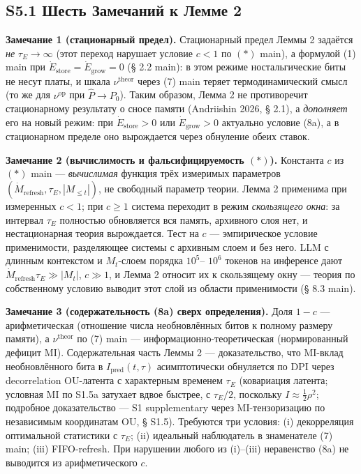 \documentclass[pdflatex,sn-mathphys-ay]{sn-jnl}
\begin{document}
\subsection*{S5.1 Шесть Замечаний к Лемме 2}\label{s5.1-ux448ux435ux441ux442ux44c-ux437ux430ux43cux435ux447ux430ux43dux438ux439-ux43a-ux43bux435ux43cux43cux435-2}



\textbf{Замечание 1 (стационарный предел).} Стационарный предел Леммы 2 задаётся \emph{не} \(\tau_E \to \infty\) (этот переход нарушает условие \(c < 1\) по \((*)\) main), а формулой (1) main при \(\dot{E}_{\text{store}} = \dot{E}_{\text{grow}} = 0\) (§ 2.2 main): в этом режиме ностальгические биты не несут платы, и шкала \(\nu^{\text{theor}}\) через (7) main теряет термодинамический смысл (то же для \(\nu^{\text{op}}\) при \(\hat P \to P_0\)). Таким образом, Лемма 2 не противоречит стационарному результату о сносе памяти (Andriishin 2026, § 2.1), а \emph{дополняет} его на новый режим: при \(\dot E_{\text{store}} > 0\) или \(\dot E_{\text{grow}} > 0\) актуально условие (8a), а в стационарном пределе оно вырождается через обнуление обеих ставок.



\textbf{Замечание 2 (вычислимость и фальсифицируемость \((*)\)).} Константа \(c\) из \((*)\) main --- \emph{вычислимая} функция трёх измеримых параметров \((\dot{M}_{\text{refresh}}, \tau_E, |M_{\le t}|)\), не свободный параметр теории. Лемма 2 применима при измеренных \(c < 1\); при \(c \ge 1\) система переходит в режим \emph{скользящего окна}: за интервал \(\tau_E\) полностью обновляется вся память, архивного слоя нет, и нестационарная теория вырождается. Тест на \(c\) --- эмпирическое условие применимости, разделяющее системы с архивным слоем и без него. LLM с длинным контекстом и \(M_t\)-слоем порядка \(10^5\)-- \(10^6\) токенов на инференсе дают \(\dot{M}_{\text{refresh}} \tau_E \gg |M_t|\), \(c \gg 1\), и Лемма 2 относит их к скользящему окну --- теория по собственному условию выводит этот слой из области применимости (§ 8.3 main).



\textbf{Замечание 3 (содержательность (8a) сверх определения).} Доля \(1-c\) --- арифметическая (отношение числа необновлённых битов к полному размеру памяти), а \(\nu^{\text{theor}}\) по (7) main --- информационно-теоретическая (нормированный дефицит MI). Содержательная часть Леммы 2 --- доказательство, что MI-вклад необновлённого бита в \(I_{\text{pred}}(t,\tau)\) асимптотически обнуляется по DPI через decorrelation OU-латента с характерным временем \(\tau_E\) (ковариация латента; условная MI по S1.5a затухает вдвое быстрее, с \(\tau_E/2\), поскольку \(I \approx \tfrac{1}{2}\rho^2\); подробное доказательство --- S1 supplementary через MI-тензоризацию по независимым координатам OU, § S1.5). Требуются три условия: (i) декорреляция оптимальной статистики с \(\tau_E\); (ii) идеальный наблюдатель в знаменателе (7) main; (iii) FIFO-refresh. При нарушении любого из (i)--(iii) неравенство (8a) не выводится из арифметического \(c\).
\end{document}
